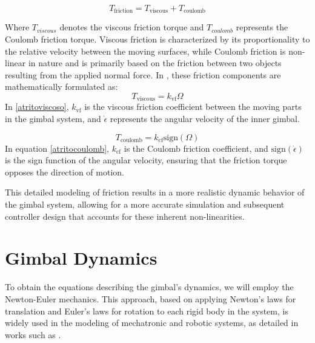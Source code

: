 \begin{equation*}
T_{\text{friction}} = T_{\text{viscous}} + T_{\text{coulomb}}
\end{equation*}

Where $T_{viscous}$ denotes the viscous friction torque and $T_{coulomb}$ represents the Coulomb friction torque. Viscous friction is characterized by its proportionality to the relative velocity between the moving surfaces, while Coulomb friction is non-linear in nature and is primarily based on the friction between two objects resulting from the applied normal force. In , these friction components are mathematically formulated as:
    \begin{equation}
      \label{atritoviscoso}
    T_{\text{viscous}} = k_{\text{vf}} \Omega
    \end{equation}
    In \ref{atritoviscoso}, $k_{\text{vf}}$ is the viscous friction coefficient between the moving parts in the gimbal system, and $\dot{\epsilon}$ represents the angular velocity of the inner gimbal.

    \begin{equation}
      \label{atritocoulomb}
    T_{\text{coulomb}} = k_{\text{cf}} \text{sign}(\Omega)
    \end{equation}
    In equation \ref{atritocoulomb}, $k_{\text{cf}}$ is the Coulomb friction coefficient, and $\text{sign}(\dot{\epsilon})$ is the sign function of the angular velocity, ensuring that the friction torque opposes the direction of motion.

This detailed modeling of friction results in a more realistic dynamic behavior of the gimbal system, allowing for a more accurate simulation and subsequent controller design that accounts for these inherent non-linearities.

\section{Gimbal Dynamics}
To obtain the equations describing the gimbal's dynamics, we will employ the Newton-Euler mechanics. This approach, based on applying Newton's laws for translation and Euler's laws for rotation to each rigid body in the system, is widely used in the modeling of mechatronic and robotic systems, as detailed in works such as .

